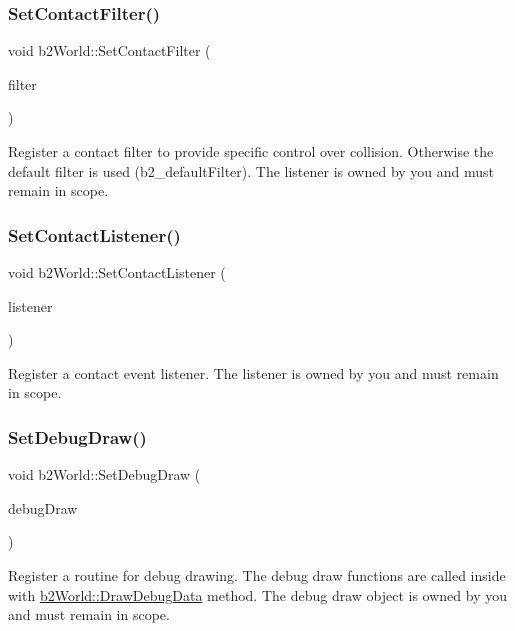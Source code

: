 \subsubsection{\texorpdfstring{Set\+Contact\+Filter()}{SetContactFilter()}}
{\footnotesize\ttfamily void b2\+World\+::\+Set\+Contact\+Filter (\begin{DoxyParamCaption}\item[{\mbox{\hyperlink{classb2ContactFilter}{b2\+Contact\+Filter}} $\ast$}]{filter }\end{DoxyParamCaption})}

Register a contact filter to provide specific control over collision. Otherwise the default filter is used (b2\+\_\+default\+Filter). The listener is owned by you and must remain in scope. \mbox{\label{classb2World_a614549967fb8a1584b61c11e2d553d42}} 
\subsubsection{\texorpdfstring{Set\+Contact\+Listener()}{SetContactListener()}}
{\footnotesize\ttfamily void b2\+World\+::\+Set\+Contact\+Listener (\begin{DoxyParamCaption}\item[{\mbox{\hyperlink{classb2ContactListener}{b2\+Contact\+Listener}} $\ast$}]{listener }\end{DoxyParamCaption})}

Register a contact event listener. The listener is owned by you and must remain in scope. \mbox{\label{classb2World_a6976d2c67400df03c0d44174ffcfb7ee}} 
\subsubsection{\texorpdfstring{Set\+Debug\+Draw()}{SetDebugDraw()}}
{\footnotesize\ttfamily void b2\+World\+::\+Set\+Debug\+Draw (\begin{DoxyParamCaption}\item[{\mbox{\hyperlink{classb2Draw}{b2\+Draw}} $\ast$}]{debug\+Draw }\end{DoxyParamCaption})}

Register a routine for debug drawing. The debug draw functions are called inside with \mbox{\hyperlink{classb2World_a293d9865e407fd463e168b0a29856acc}{b2\+World\+::\+Draw\+Debug\+Data}} method. The debug draw object is owned by you and must remain in scope. \mbox{\label{classb2World_ae377f2dd5512ada7d27f4ad3541c75bf}} 
